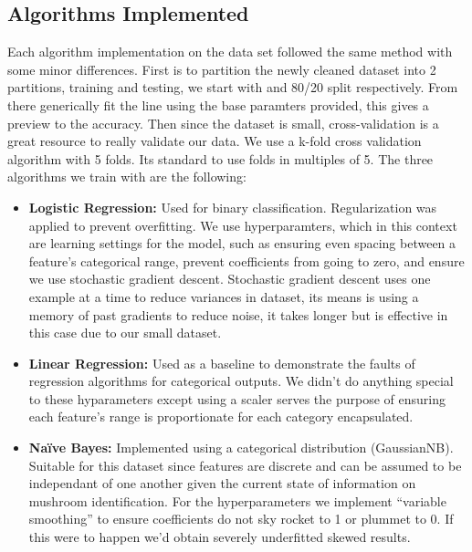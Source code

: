 \documentclass[conference]{IEEEtran}
\begin{document}
\subsection{Algorithms Implemented}
    Each algorithm implementation on the data set followed the same method with some minor differences. First is to partition the newly cleaned dataset into 2 partitions, training and testing, we start with and 80/20 split respectively. From there generically fit the line using the base paramters provided, this gives a preview to the accuracy. Then since the dataset is small, cross-validation is a great resource to really validate our data. We use a k-fold cross validation algorithm with 5 folds. Its standard to use folds in multiples of 5. The three algorithms we train with are the following:
\begin{itemize}
    \item \textbf{Logistic Regression:} Used for binary classification. Regularization was applied to prevent overfitting. We use hyperparamters, which in this context are learning settings for the model, such as ensuring even spacing between a feature's categorical range, prevent coefficients from going to zero, and ensure we use stochastic gradient descent. Stochastic gradient descent uses one example at a time to reduce variances in dataset, its means is using a memory of past gradients to reduce noise, it takes longer but is effective in this case due to our small dataset.

    \item \textbf{Linear Regression:} Used as a baseline to demonstrate the faults of regression algorithms for categorical outputs. We didn't do anything special to these hyparameters except using a scaler serves the purpose of ensuring each feature's range is proportionate for each category encapsulated. 
    
    \item \textbf{Naïve Bayes:} Implemented using a categorical distribution (GaussianNB). Suitable for this dataset since features are discrete and can be assumed to be independant of one another given the current state of information on mushroom identification. For the hyperparameters we implement ``variable smoothing'' to ensure coefficients do not sky rocket to 1 or plummet to 0. If this were to happen we'd obtain severely underfitted skewed results.
\end{itemize}
\end{document}
